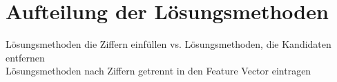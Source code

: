 \section{Aufteilung der Lösungsmethoden}

Lösungsmethoden die Ziffern einfüllen vs. Lösungsmethoden, die Kandidaten entfernen\\
Lösungsmethoden nach Ziffern getrennt in den Feature Vector eintragen